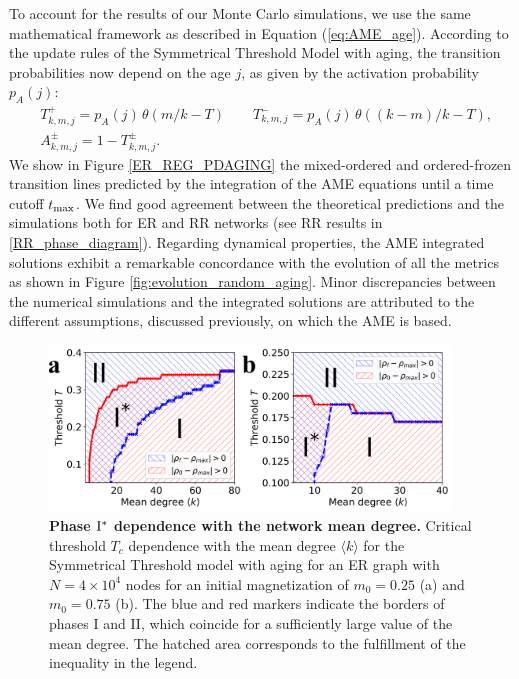 To account for the results of our Monte Carlo simulations, we use the same mathematical framework as described in Equation (\ref{eq:AME_age}). According to the update rules of the Symmetrical Threshold Model with aging, the transition probabilities now depend on the age $j$, as given by the activation probability  $p_A (j)$:
\begin{eqnarray}
    &T^{+}_{k,m,j} = p_A(j) \, \theta(m/k - T) \quad \quad T^{-}_{k,m,j} = p_A(j) \, \theta((k-m)/k - T), \nonumber\\
    &A^{\pm}_{k,m,j} = 1 - T^{\pm}_{k,m,j}.
\end{eqnarray}
We show in Figure \ref{ER_REG_PDAGING} the mixed-ordered and ordered-frozen transition lines predicted by the integration of the AME equations until a time cutoff $t_{\rm max}$. We find good agreement between the theoretical predictions and the simulations both for ER and RR networks (see RR results in \ref{RR_phase_diagram}). Regarding dynamical properties, the AME integrated solutions exhibit a remarkable concordance with the evolution of all the metrics as shown in Figure \ref{fig:evolution_random_aging}. Minor discrepancies between the numerical simulations and the integrated solutions are attributed to the different assumptions, discussed previously, on which the AME is based.  
\begin{figure}[b]
        \centering
        \includegraphics[width=0.95\textwidth]{Figs/Aging_STM/FIG8.pdf}
        \caption{\label{fig:PD_Z} \textbf{Phase ${\rm I}^{*}$ dependence with the network mean degree.} Critical threshold $T_c$ dependence with the mean degree $\langle k \rangle$ for the Symmetrical Threshold model with aging for an ER graph with $N = 4 \times 10^4$ nodes for an initial magnetization of $m_0 = 0.25$ (a) and $m_0 = 0.75$ (b). The blue and red markers indicate the borders of phases I and II, which coincide for a sufficiently large value of the mean degree. The hatched area corresponds to the fulfillment of the inequality in the legend.}
\end{figure}

